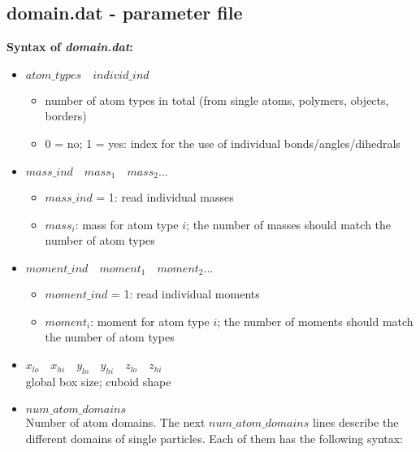 \subsection{domain.dat - parameter file}
\textbf{Syntax of \textit{domain.dat}:}
\begin{itemize}

\item $  atom\_types \quad   individ\_ind $
	\begin{itemize}
	\item number of atom types in total (from single atoms, polymers, objects, borders)
	\item 0 = no; 1 = yes: index for the use of individual bonds/angles/dihedrals
	\end{itemize}

\item $  mass\_ind \quad   mass_1 \quad   mass_2 ... $
	\begin{itemize}
	\item $ mass\_ind$ = 1: read individual masses
	\item $ mass_i$: mass for atom type $i$; the number of masses should match the number of atom types
	\end{itemize}

\item $  moment\_ind \quad   moment_1 \quad   moment_2 ... $
	\begin{itemize}
	\item $ moment\_ind$ = 1: read individual moments
	\item $ moment_i$: moment for atom type $i$; the number of moments should match the number of atom types
	\end{itemize}

\item $ x_{lo} \quad x_{hi} \quad y_{lo} \quad y_{hi} \quad z_{lo} \quad z_{hi} $ \\
	{ global box size; cuboid shape}

\item $num\_atom\_domains$ \\
	{Number of atom domains. The next $num\_atom\_domains$ lines describe the different domains of single particles. Each of them has the following syntax:}


\end{itemize}
